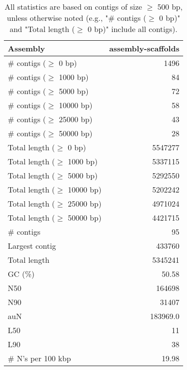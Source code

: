 \documentclass[12pt,a4paper]{article}
\begin{document}
\begin{table}[ht]
\begin{center}
\caption{All statistics are based on contigs of size $\geq$ 500 bp, unless otherwise noted (e.g., "\# contigs ($\geq$ 0 bp)" and "Total length ($\geq$ 0 bp)" include all contigs).}
\begin{tabular}{|l*{1}{|r}|}
\hline
Assembly & assembly-scaffolds \\ \hline
\# contigs ($\geq$ 0 bp) & 1496 \\ \hline
\# contigs ($\geq$ 1000 bp) & 84 \\ \hline
\# contigs ($\geq$ 5000 bp) & 72 \\ \hline
\# contigs ($\geq$ 10000 bp) & 58 \\ \hline
\# contigs ($\geq$ 25000 bp) & 43 \\ \hline
\# contigs ($\geq$ 50000 bp) & 28 \\ \hline
Total length ($\geq$ 0 bp) & 5547277 \\ \hline
Total length ($\geq$ 1000 bp) & 5337115 \\ \hline
Total length ($\geq$ 5000 bp) & 5292550 \\ \hline
Total length ($\geq$ 10000 bp) & 5202242 \\ \hline
Total length ($\geq$ 25000 bp) & 4971024 \\ \hline
Total length ($\geq$ 50000 bp) & 4421715 \\ \hline
\# contigs & 95 \\ \hline
Largest contig & 433760 \\ \hline
Total length & 5345241 \\ \hline
GC (\%) & 50.58 \\ \hline
N50 & 164698 \\ \hline
N90 & 31407 \\ \hline
auN & 183969.0 \\ \hline
L50 & 11 \\ \hline
L90 & 38 \\ \hline
\# N's per 100 kbp & 19.98 \\ \hline
\end{tabular}
\end{center}
\end{table}
\end{document}
